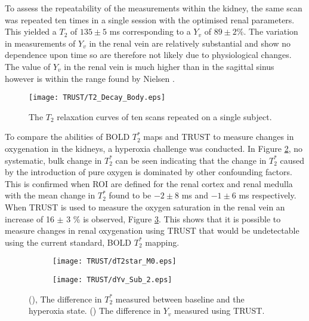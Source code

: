 To assess the repeatability of the measurements within the kidney, the same scan was repeated ten times in a single session with the optimised renal parameters. This yielded a $T_2$ of $135\pm5$ ms corresponding to a $Y_v$ of $89\pm2\%$. The variation in measurements of $Y_v$ in the renal vein are relatively substantial and show no dependence upon time so are therefore not likely due to physiological changes. The value of $Y_v$ in the renal vein is much higher than in the sagittal sinus however is within the range found by Nielsen \cite{nielsen_renal_1992}.\\

\begin{figure}[H]
	\centering
	\texttt{[image: TRUST/T2\_Decay\_Body.eps]}
	\caption{The $T_2$ relaxation curves of ten scans repeated on a single subject.}
	\label{fig:T2_Decay_Body}	
\end{figure}

To compare the abilities of \ac{BOLD} $T_2^*$ maps and \ac{TRUST} to measure changes in oxygenation in the kidneys, a hyperoxia challenge was conducted. In Figure \ref{fig:dT2star}, no systematic, bulk change in $T_2^*$ can be seen indicating that the change in $T_2^*$ caused by the introduction of pure oxygen is dominated by other confounding factors. This is confirmed when \ac{ROI} are defined for the renal cortex and renal medulla with the mean change in $T_2^*$ found to be $-2 \pm 8$ ms and $-1 \pm 6$ ms respectively. When \ac{TRUST} is used to measure the oxygen saturation in the renal vein an increase of 16 $\pm$ 3 \% is observed, Figure \ref{fig:dYv}. This shows that it is possible to measure changes in renal oxygenation using \ac{TRUST} that would be undetectable using the current standard, \ac{BOLD} $T_2^*$ mapping.
\begin{figure}[H]
	\centering
	\begin{subfigure}[c]{0.47\textwidth}
		\centering
		\texttt{[image: TRUST/dT2star\_M0.eps]}
		\caption{}
		\label{fig:dT2star}
	\end{subfigure}
	\hfill
	\begin{subfigure}[c]{0.47\textwidth}
		\centering
		\texttt{[image: TRUST/dYv\_Sub\_2.eps]}
		\caption{}
		\label{fig:dYv}
	\end{subfigure}
	\caption{(), The difference in $T_2^*$ measured between baseline and the hyperoxia state. () The difference in $Y_v$ measured using \ac{TRUST}.}
	\label{fig:oxygen_chalenge_results}
\end{figure}

